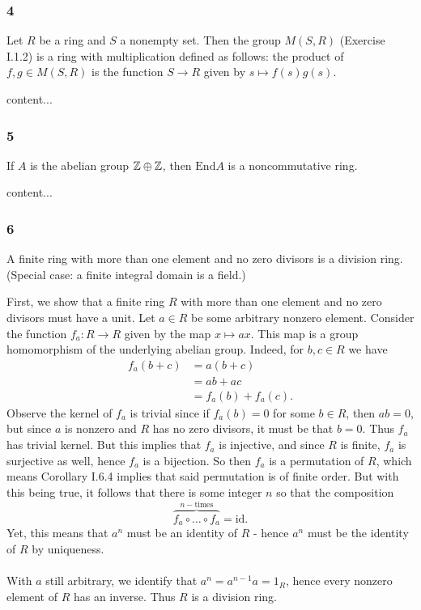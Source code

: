 \subsubsection*{4}
\begin{graybox}
	Let $R$ be a ring and $S$ a nonempty set. Then the group $M(S,R)$ (Exercise I.1.2) is a ring with multiplication defined as follows: the product of $f, g \in M(S,R)$ is the function $S \to R$ given by $s \mapsto f(s)g(s)$.
\end{graybox}
\begin{solution}
	content...
\end{solution}

\subsubsection*{5}
\begin{graybox}
	If $A$ is the abelian group $\mathbb{Z} \oplus \mathbb{Z}$, then $\text{End} A$ is a noncommutative ring.
\end{graybox}
\begin{solution}
	content...
\end{solution}

\subsubsection*{6}
\begin{graybox}
	A finite ring with more than one element and no zero divisors is a division ring. (Special case: a finite integral domain is a field.)
\end{graybox}
\begin{solution}
	First, we show that a finite ring $R$ with more than one element and no zero divisors must have a unit. Let $a \in R$ be some arbitrary nonzero element. Consider the function $f_a : R \to R$ given by the map $x \mapsto ax$. This map is a group homomorphism of the underlying abelian group. Indeed, for $b,c \in R$ we have
	\begin{align*}
		f_a(b + c) &= a(b + c)\\
		&= ab + ac\\
		&= f_a(b) + f_a(c).
	\end{align*}
	Observe the kernel of $f_a$ is trivial since if $f_a(b) = 0$ for some $b \in R$, then $ab = 0$, but since $a$ is nonzero and $R$ has no zero divisors, it must be that $b = 0$. Thus $f_a$ has trivial kernel. But this implies that $f_a$ is injective, and since $R$ is finite, $f_a$ is surjective as well, hence $f_a$ is a bijection. So then $f_a$ is a permutation of $R$, which means Corollary I.6.4 implies that said permutation is of finite order. But with this being true, it follows that there is some integer $n$ so that the composition
	$$
		\overbrace{f_a \circ \dots \circ f_a}^{n-\text{times}} = \text{id}.
	$$
	Yet, this means that $a^n$ must be an identity of $R$ - hence $a^n$ must be the identity of $R$ by uniqueness.\\
	\\
	With $a$ still arbitrary, we identify that $a^n = a^{n-1}a = 1_R$, hence every nonzero element of $R$ has an inverse. Thus $R$ is a division ring.
\end{solution}


